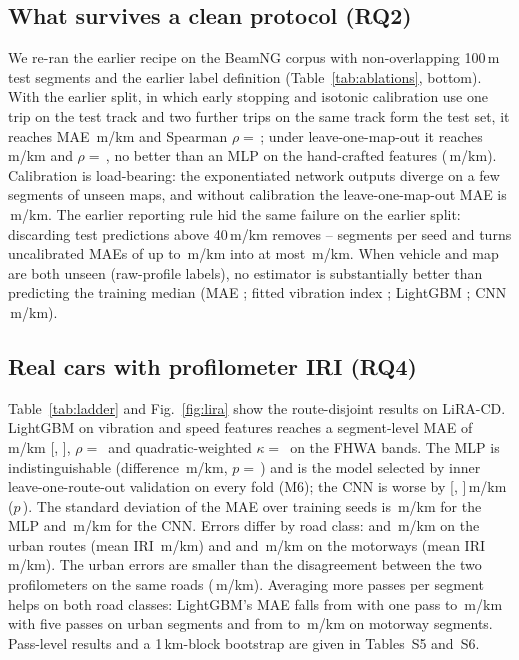 \subsection{What survives a clean protocol (RQ2)}
\label{sec:res_protocol}
We re-ran the earlier recipe on the BeamNG corpus with non-overlapping 100\,m test segments and the earlier label definition (Table~\ref{tab:ablations}, bottom).
With the earlier split, in which early stopping and isotonic calibration use one trip on the test track and two further trips on the same track form the test set, it reaches MAE \bngSthreeLegacyMae\,m/km and Spearman $\rho=$\,\bngSthreeLegacyRho; under leave-one-map-out it reaches \bngSoneLegacyMae\,m/km and $\rho=$\,\bngSoneLegacyRho, no better than an MLP on the hand-crafted features (\bngSoneCorrMlpMae\,m/km).
Calibration is load-bearing: the exponentiated network outputs diverge on a few segments of unseen maps, and without calibration the leave-one-map-out MAE is \bngSoneLegacyUncalMae\,m/km.
The earlier reporting rule hid the same failure on the earlier split: discarding test predictions above 40\,m/km removes \discardMinN--\discardMaxN{} segments per seed and turns uncalibrated MAEs of up to \discardMaxUnfiltered\,m/km into at most \discardMaxFiltered\,m/km.
When vehicle and map are both unseen (raw-profile labels), no estimator is substantially better than predicting the training median (MAE \bngStwoConstMae; fitted vibration index \bngStwoPhysMae; LightGBM \bngStwoGbmMae; CNN \bngStwoCnnMae\,m/km).

\subsection{Real cars with profilometer IRI (RQ4)}
\label{sec:res_real}
Table~\ref{tab:ladder} and Fig.~\ref{fig:lira} show the route-disjoint results on LiRA-CD.
LightGBM on vibration and speed features reaches a segment-level MAE of \liraGbmMae\,m/km [\liraGbmMaeLo, \liraGbmMaeHi], $\rho=$\,\liraGbmRho{} and quadratic-weighted $\kappa=$\,\liraGbmKappa{} on the FHWA bands.
The MLP is indistinguishable (difference \liraMlpDmae\,m/km, $p=$\,\liraMlpP) and is the model selected by inner leave-one-route-out validation on every fold (M6); the CNN is worse by \liraCnnDmae{} [\liraCnnDmaeLo, \liraCnnDmaeHi]\,m/km ($p$\,\liraCnnP).
The standard deviation of the MAE over training seeds is \liraMlpSeedSd\,m/km for the MLP and \liraCnnSeedSd\,m/km for the CNN.
Errors differ by road class: \liraGbmMaeCphOne{} and \liraGbmMaeCphSix\,m/km on the urban routes (mean IRI \liraIriUrban\,m/km) and \liraGbmMaeMwThree{} and \liraGbmMaeMwThirteen\,m/km on the motorways (mean IRI \liraIriMotorway\,m/km).
The urban errors are smaller than the disagreement between the two profilometers on the same roads (\aranUrbanMae\,m/km).
Averaging more passes per segment helps on both road classes: LightGBM's MAE falls from \passGbmUrbanOne{} with one pass to \passGbmUrbanFive\,m/km with five passes on urban segments and from \passGbmMotorwayOne{} to \passGbmMotorwayFive\,m/km on motorway segments.
Pass-level results and a 1\,km-block bootstrap are given in Tables~S5 and~S6.

